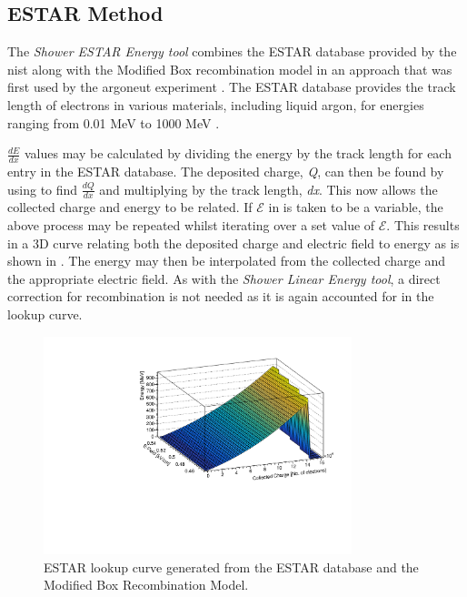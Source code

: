 \subsection{ESTAR Method}
The \textit{Shower ESTAR Energy tool} combines the ESTAR database provided by the \gls{nist} along with the Modified Box recombination model in an approach that was first used by the \Gls{argoneut} experiment \cite{ArgoNeuT_ESTAR_paper}. The ESTAR database provides the track length of electrons in various materials, including liquid argon, for energies ranging from 0.01 MeV to 1000 MeV \cite{ESTAR_Database}.

$\frac{dE}{dx}$ values may be calculated by dividing the energy by the track length for each entry in the ESTAR database. The deposited charge, \textit{Q}, can then be found by using  to find $\frac{dQ}{dx}$ and multiplying by the track length, \textit{dx}. This now allows the collected charge and energy to be related. If $\mathcal{E}$ in  is taken to be a variable, the above process may be repeated whilst iterating over a set value of $\mathcal{E}$. This results in a 3D curve relating both the deposited charge and electric field to energy as is shown in . The energy may then be interpolated from the collected charge and the appropriate electric field. As with the \textit{Shower Linear Energy tool}, a direct correction for recombination is not needed as it is again accounted for in the lookup curve. 

\begin{figure}[h!]
    \centering
    \includegraphics[width = 0.8\textwidth]{figures-chap4/ESTAR_lookup_curve.pdf}
    \caption[ESTAR lookup curve.]{ESTAR lookup curve generated from the ESTAR database and the Modified Box Recombination Model.}
    \label{fig:ESTAR lookup curve}
\end{figure}

